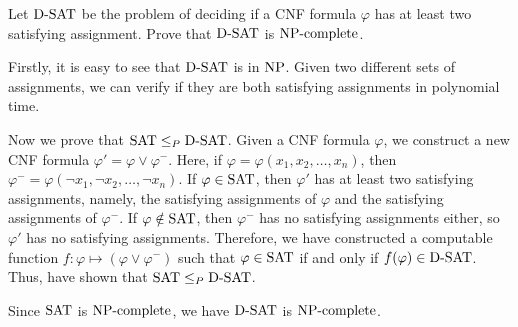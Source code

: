 \documentclass{homework}
\begin{document}
\begin{problem}
  Let $\mathrm{D\text{-}SAT}$ be the problem of deciding if a CNF formula
  $\varphi$ has at least two satisfying assignment.
  Prove that $\mathrm{D\text{-}SAT}$ is $\textup{NP}\text{-complete}$.
\end{problem}

\begin{solution}

  Firstly, it is easy to see that $\mathrm{D\text{-}SAT}$ is in $\textup{NP}$.
  Given two different sets of assignments, we can verify if they are both
  satisfying assignments in polynomial time.

  Now we prove that $\mathrm{SAT} \le_P\mathrm{D\text{-}SAT}$.
  Given a CNF formula $\varphi$, we construct a new CNF formula
  $\varphi' = \varphi \lor \varphi^{-}$.
  Here, if $\varphi=\varphi(x_1, x_2, \ldots, x_n)$,
  then $\varphi^{-} = \varphi(\neg x_1, \neg x_2, \ldots, \neg x_n)$.
  If $\varphi \in \mathrm{SAT}$, then $\varphi'$ has at least two
  satisfying assignments, namely, the satisfying assignments of $\varphi$ and
  the satisfying assignments of $\varphi^{-}$.
  If $\varphi \notin \mathrm{SAT}$,
  then $\varphi^{-}$ has no satisfying assignments either,
  so $\varphi'$ has no satisfying assignments.
  Therefore, we have constructed a computable function
  $f: \varphi \mapsto (\varphi \lor \varphi^{-})$ such that
  $\varphi \in \mathrm{SAT}$ if and only if $f(\varphi) \in \mathrm{D\text{-}SAT}$.
  Thus, have shown that $\mathrm{SAT} \le_P\mathrm{D\text{-}SAT}$.

  Since $\mathrm{SAT}$ is $\textup{NP}\text{-complete}$, we have $\mathrm{D\text{-}SAT}$ is $\textup{NP}\text{-complete}$.

\end{solution}
\end{document}
